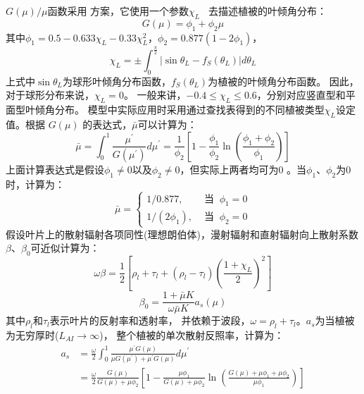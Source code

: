 $G(\mu) / \mu$函数采用 \citet{goudriaan1977crop} 方案，它使用一个参数$\chi_{L}$~\citep{ross1975radiative} 去描述植被的叶倾角分布：
\begin{equation}\label{Gmu}
G(\mu)=\phi_{1}+\phi_{2} \mu
\end{equation}
其中$\phi_{1}=0.5-0.633 \chi_{L}-0.33 \chi_{L}^{2}$，$\phi_{2}=0.877\left(1-2 \phi_{1}\right)$，
\begin{equation}
\chi_{L}=\pm \int_{0}^{\frac{\pi}{2}}\left|\sin \theta_{L}-f_{S}\left(\theta_{L}\right)\right| d \theta_{L}
\end{equation}
上式中$\sin \theta_{L}$为球形叶倾角分布函数，$f_{S}\left(\theta_{L}\right)$为植被的叶倾角分布函数。
因此，对于球形分布来说，$\chi_{L}=0$。 一般来讲，$-0.4 \leqslant \chi_{L} \leqslant 0.6$，分别对应竖直型和平面型叶倾角分布。
模型中实际应用时采用通过查找表得到的不同植被类型$\chi_{L}$设定值。根据 $G(\mu)$ 的表达式，$\bar{\mu}$可以计算为：
\begin{equation}
\bar{\mu}=\int_{0}^{1} \frac{\mu^{\prime}}{G\left(\mu^{\prime}\right)}
 d \mu^{\prime}=\frac{1}{\phi_{2}}\left[1-\frac{\phi_{1}}{\phi_{2}}
 \ln \left(\frac{\phi_{1}+\phi_{2}}{\phi_{1}}\right)\right]
\end{equation}
上面计算表达式是假设$\phi_{1} \neq 0$以及$\phi_{2} \neq 0$，但实际上两者均可为0 \citep{dai2004two}。当$\phi_{1}$、$\phi_{2}$为0时，计算为：
\begin{equation}
\bar{\mu}= \begin{cases} 
1 / 0.877, & \text { 当 }\ \phi_{1}=0 \\
1 /\left(2 \phi_{1}\right), & \text { 当 }\ \phi_{2}=0
\end{cases}
\end{equation}
假设叶片上的散射辐射各项同性(理想朗伯体)，漫射辐射和直射辐射向上散射系数$\beta$、$\beta_0$可近似计算为：
\begin{equation}
\omega \beta=\frac{1}{2}\left[\rho_{l}+\tau_{l}+\left(\rho_{l}-\tau_{l}\right)\left(\frac{1+\chi_{L}}{2}\right)^{2}\right]
\end{equation}
%
\begin{equation}\label{beta0}
\beta_{0}=\frac{1+\bar{\mu} K}{\omega \bar{\mu} K} a_{s}(\mu)
\end{equation}
其中$\rho_l$和$\tau_l$表示叶片的反射率和透射率，
并依赖于波段，$\omega=\rho_l+\tau_l$。$a_s$为当植被为无穷厚时($L_{AI}\rightarrow\infty$)，
整个植被的单次散射反照率，计算为：
\begin{equation}
\begin{aligned} 
a_{s} &=\frac{\omega}{2} \int_{0}^{1} \frac{\mu^{\prime} G\left(\mu \right)}{\mu G\left(\mu^{\prime}\right)+\mu^{\prime} 
G(\mu)} d \mu^{\prime} \\[1ex]
&=\frac{\omega}{2} \frac{G(\mu)}{G(\mu)+\mu \phi_{2}}\left[1-\frac{\mu \phi_{1}}{G(\mu)+\mu \phi_{2}} 
\ln \left(\frac{G(\mu)+\mu \phi_{1}+\mu \phi_{2}}{\mu \phi_{1}}\right)\right] 
\end{aligned}
\end{equation}

